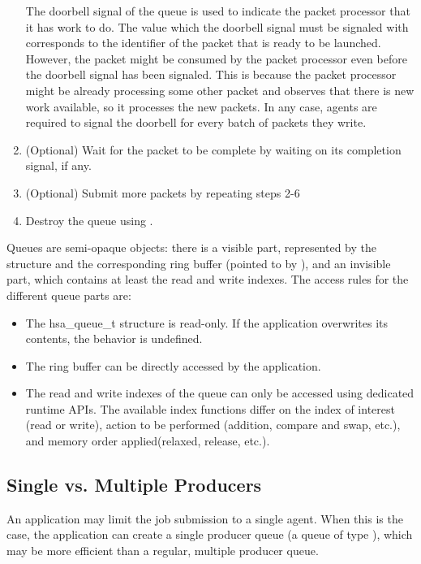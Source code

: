 \documentclass[oneside]{book}
\begin{document}
\begin{enumerate}[itemsep=1pt,topsep=3pt,partopsep=0pt]
  The doorbell signal of the queue is used to indicate the packet processor that
  it has work to do. The value which the doorbell signal must be signaled with
  corresponds to the identifier of the packet that is ready to be launched.
  However, the packet might be consumed by the packet processor even before the
  doorbell signal has been signaled. This is because the packet processor might
  be already processing some other packet and observes that there is new work
  available, so it processes the new packets. In any case, agents are
  required to signal the doorbell for every batch of packets they write.

\item (Optional) Wait for the packet to be complete by waiting on its completion
  signal, if any.

\item (Optional) Submit more packets by repeating steps 2-6

\item Destroy the queue using .
\end{enumerate}

Queues are semi-opaque objects: there is a visible part, represented by the
 structure and the corresponding ring buffer (pointed to by
), and an invisible part, which contains at
least the read and write indexes. The access rules for the different queue parts
are:
\begin{itemize}[itemsep=1pt,topsep=3pt,partopsep=0pt]
\item The {hsa_queue_t} structure is read-only. If the application overwrites
  its contents, the behavior is undefined.
\item The ring buffer can be directly accessed by the application.
\item The read and write indexes of the queue can only be accessed using
  dedicated runtime APIs.  The available index functions differ on the index of
  interest (read or write), action to be performed (addition, compare and swap,
  etc.), and memory order applied(relaxed, release, etc.).
\end{itemize}

\subsection{Single vs. Multiple Producers}

An application may limit the job submission to a single agent. When this is the
case, the application can create a single producer queue (a queue of type
), which may be more efficient than a regular,
multiple producer queue.
\end{document}
